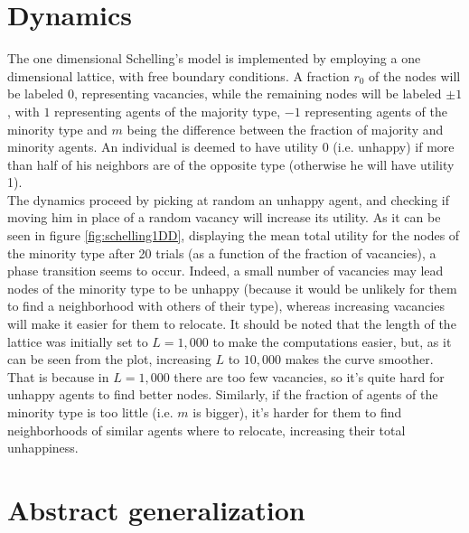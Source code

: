\section{Dynamics}

The one dimensional Schelling's model is implemented by employing a one dimensional lattice, with free boundary conditions. A fraction $r_0$ of the nodes will be labeled 0, representing vacancies, while the remaining nodes will be labeled $\pm1$, with $1$ representing agents of the majority type, $-1$ representing agents of the minority type and $m$ being the difference between the fraction of majority and minority agents. An individual is deemed to have utility 0 (i.e. unhappy) if more than half of his neighbors are of the opposite type (otherwise he will have utility 1). \\
The dynamics proceed by picking at random an unhappy agent, and checking if moving him in place of a random vacancy will increase its utility. As it can be seen in figure \ref{fig:schelling1DD}, displaying the mean total utility for the nodes of the minority type after 20 trials (as a function of the fraction of vacancies), a phase transition seems to occur. Indeed, a small number of vacancies may lead nodes of the minority type to be unhappy (because it would be unlikely for them to find a neighborhood with others of their type), whereas increasing vacancies will make it easier for them to relocate. It should be noted that the length of the lattice was initially set to $L=1,000$ to make the computations easier, but, as it can be seen from the plot, increasing $L$ to $10,000$ makes the curve smoother. That is because in $L=1,000$ there are too few vacancies, so it's quite hard for unhappy agents to find better nodes. Similarly, if the fraction of agents of the minority type is too little (i.e. $m$ is bigger), it's harder for them to find neighborhoods of similar agents where to relocate, increasing their total unhappiness. 


\section{Abstract generalization}

